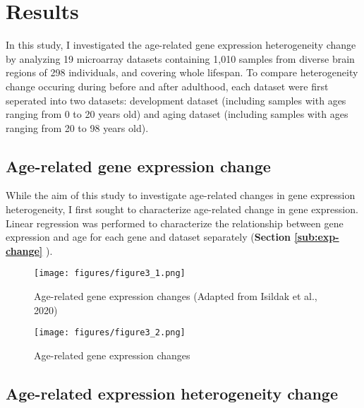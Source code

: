 \chapter{Results}
\label{chp:b3}

In this study, I investigated the age-related gene expression heterogeneity change by analyzing 19 microarray datasets
containing 1,010 samples from diverse brain regions of 298 individuals, and covering whole lifespan.
To compare heterogeneity change occuring during before and after adulthood, each dataset were first seperated into two datasets: development dataset 
(including samples with ages ranging from 0 to 20 years old) and aging dataset (including samples with ages ranging from 20 to 98 years old).

\section{Age-related gene expression change}
While the aim of this study to investigate age-related changes in gene expression heterogeneity, I first sought to characterize age-related change in gene expression.
Linear regression was performed to characterize the relationship between gene expression and age for each gene and dataset separately (\textbf{Section \ref{sub:exp-change}} ).

\begin{figure}[h]
\centering
\texttt{[image: figures/figure3\_1.png]}
\caption{Age-related gene expression changes (Adapted from Isildak et al., 2020)}
\label{fig:fig3.1}
\end{figure}

\begin{figure}[h]
    \centering
    \texttt{[image: figures/figure3\_2.png]}
    \caption{Age-related gene expression changes}
    \label{fig:fig3.2}
    \end{figure}

\section{Age-related expression heterogeneity change}




